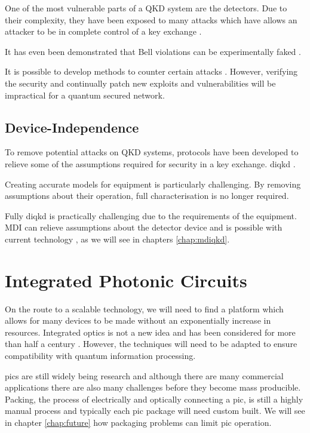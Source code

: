One of the most vulnerable parts of a \ac{QKD} system are the detectors. Due to their complexity, they have been exposed to many attacks which have allows an attacker to be in complete control of a key exchange \cite{Makarov2006, Gerhardt2011a, Lydersen2010a, Lydersen2010b, Lydersen2011, Sauge2011, Makarov2009, Wiechers2011}.

It has even been demonstrated that Bell violations can be experimentally faked \cite{Gerhardt2011b}.

It is possible to develop methods to counter certain attacks \cite{Lydersen2010c, Yuan2010}. However, verifying the security and continually patch new exploits and vulnerabilities will be impractical for a quantum secured network.

\subsection{Device-Independence}

To remove potential attacks on \ac{QKD} systems, protocols have been developed to relieve some of the assumptions required for security in a key exchange. \Ac{diqkd}  \cite{Acin2007, Barrett2005, Mayers1998}. 

Creating accurate models for equipment is particularly challenging. By removing assumptions about their operation, full characterisation is no longer required.

Fully \ac{diqkd} is practically challenging due to the requirements of the equipment. \ac{MDI} can relieve assumptions about the detector device and is possible with current technology \cite{mdi-qkd}, as we will see in chapters \ref{chap:mdiqkd}. 

\section{Integrated Photonic Circuits}

On the route to a scalable technology, we will need to find a platform which allows for many devices to be made without an exponentially increase in resources. Integrated optics is not a new idea and has been considered for more than half a century \cite{miller1969}. However, the techniques will need to be adapted to ensure compatibility with quantum information processing.

\Acp{pic} are still widely being research and although there are many commercial applications there are also many challenges before they become mass producible. Packing, the process of electrically and optically connecting a \ac{pic}, is still a highly manual process and typically each \ac{pic} package will need custom built. We will see in chapter \ref{chap:future} how packaging problems can limit \ac{pic} operation.

